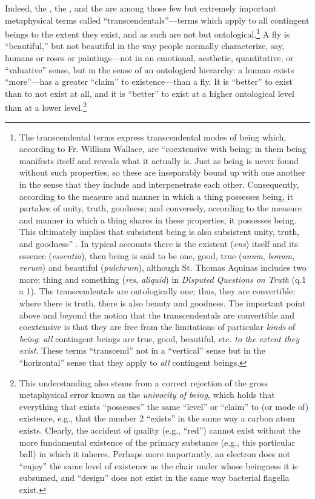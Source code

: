 Indeed, the , the , and the  are among those few but extremely important metaphysical terms called ``transcendentals''---terms which apply to all contingent beings to the extent they exist, and as such are not  but ontological.\footnote{The transcendental terms express transcendental modes of being which, according to Fr. William Wallace, are ``coextensive with being; in them being manifests itself and reveals what it actually is. Just as being is never found without such properties, so these are inseparably bound up with one another in the sense that they include and interpenetrate each other. Consequently, according to the measure and manner in which a thing possesses being, it partakes of unity, truth, goodness; and conversely, according to the measure and manner in which a thing shares in these properties, it possesses being. This ultimately implies that subsistent being is also subsistent unity, truth, and goodness'' \citep[][p. 85]{ephil}.  In typical accounts there is the existent (\textit{ens}) itself and its essence (\textit{essentia}), then being is said to be one, good, true (\textit{unum}, \textit{bonum}, \textit{verum}) and beautiful (\textit{pulchrum}), although St. Thomas Aquinas includes two more: thing and something (\textit{res}, \textit{aliquid}) in \textit{Disputed Questions on Truth} (q.1 a 1). The transcendentals are ontologically one; thus, they are convertible: where there is truth, there is also beauty and goodness. The important point above and beyond the notion that the transcendentals are convertible and coextensive is that they are free from the limitations of particular \textit{kinds} of \textit{being}: \textit{all} contingent beings are true, good, beautiful, etc. \textit{to the extent they exist}. These terms ``transcend'' not in a ``vertical'' sense but in the ``horizontal'' sense that they apply to \textit{all} contingent beings.} 
A fly is ``beautiful,'' but not beautiful in the way people normally characterize, say, humans or roses or paintings---not in an emotional, aesthetic, quantitative, or ``valuative'' sense, but in the sense of an ontological hierarchy: a human exists ``more''---has a greater ``claim'' to existence---than a fly. It is ``better'' to exist than to not exist at all, and it is ``better'' to exist at a higher ontological level than at a lower level.\footnote{This understanding also stems from a correct rejection of the gross metaphysical error known as the \textit{univocity of being}, which holds that everything that exists ``possesses'' the same ``level'' or ``claim'' to (or mode of) existence, e.g., that the number 2 ``exists'' in the same way a carbon atom exists. Clearly, the accident of quality (e.g., ``red'') cannot exist without the more fundamental existence of the primary substance (e.g., this particular ball) in which it inheres. Perhaps more importantly, an electron does not ``enjoy'' the same level of existence as the chair under whose beingness it is subsumed, and ``design'' does not exist in the same way bacterial flagella exist.} 


